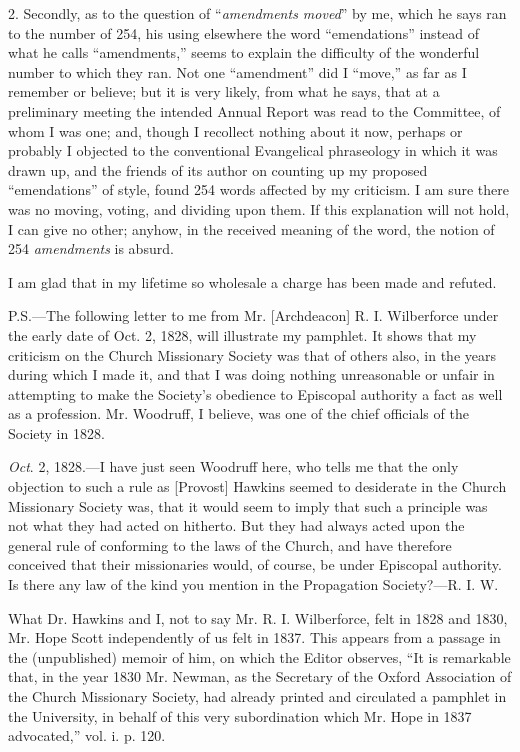 2. Secondly, as to the question of ``\emph{amendments
moved}'' by me, which he says ran to the number of 254, his using
elsewhere the word ``emendations'' instead of what he calls ``amendments,''
seems to explain the difficulty of the wonderful number to which they
ran. Not one ``amendment'' did I ``move,'' as far as I remember or believe; but it is very likely, from what he says, that at a
preliminary meeting the intended Annual Report was read to the
Committee, of whom I was one; and, though I recollect nothing about it
now, perhaps or probably I objected to the conventional Evangelical
phraseology in which it was drawn up, and the friends of its author on
counting up my proposed ``emendations'' of style, found 254 words
affected by my criticism. I am sure there was no moving, voting, and
dividing upon them. If this explanation will not hold, I can give no
other; anyhow, in the received meaning of the word, the notion of 254 \emph{amendments}
is absurd.

I am glad that in my lifetime so wholesale a
charge has been made and refuted.

P.S.—The following letter to me from Mr.
[Archdeacon] R. I. Wilberforce under the early date of Oct. 2, 1828,
will illustrate my pamphlet. It shows that my criticism on the Church
Missionary Society was that of others also, in the years during which
I made it, and that I was doing nothing unreasonable or unfair in
attempting to make the Society's obedience to Episcopal authority a
fact as well as a profession. Mr. Woodruff, I believe, was one of the
chief officials of the Society in 1828.

\emph{Oct}.
2, 1828.—I have just seen Woodruff here, who tells me that the only
objection to such a rule as [Provost] Hawkins seemed
to desiderate in the Church Missionary Society was, that it would seem
to imply that such a principle was not what they had acted on
hitherto. But they had always acted upon the general rule of
conforming to the laws of the Church, and have therefore conceived
that their missionaries would, of course, be under Episcopal
authority. Is there any law of the kind you mention in the Propagation
Society?—R. I. W.

What Dr. Hawkins and I, not to say Mr. R. I.
Wilberforce, felt in 1828 and 1830, Mr. Hope Scott independently of us
felt in 1837. This appears from a passage in the (unpublished) memoir
of him, on which the Editor observes, ``It is remarkable that, in the
year 1830 Mr. Newman, as the Secretary of the Oxford Association of
the Church Missionary Society, had already printed and circulated a
pamphlet in the University, in behalf of this very subordination which
Mr. Hope in 1837 advocated,'' vol. i. p. 120.

